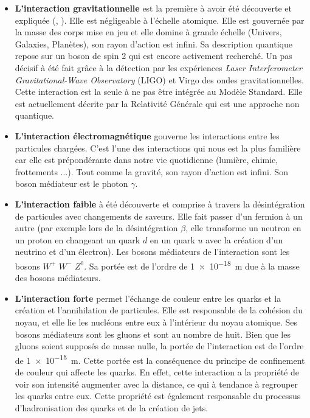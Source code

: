 \begin{itemize}[label=$\bullet$]
\item \textbf{L'interaction gravitationnelle} est la première à avoir été découverte et expliquée (, ). Elle est négligeable à l'échelle atomique. Elle est gouvernée par la masse des corps mise en jeu et elle domine à grande échelle (Univers, Galaxies, Planètes), son rayon d'action est infini. Sa description quantique repose sur un boson de spin \num{2} qui est encore activement recherché. Un pas décisif à été fait grâce à la détection par les expériences \textit{Laser Interferometer Gravitational-Wave Observatory} (LIGO) et Virgo des ondes gravitationnelles. Cette interaction est la seule à ne pas être intégrée au Modèle Standard. Elle est actuellement décrite par la Relativité Générale qui est une approche non quantique.

\item \textbf{L'interaction électromagnétique} gouverne les interactions entre les particules chargées. C'est l'une des interactions qui nous est la plus familière car elle est prépondérante dans notre vie quotidienne (lumière, chimie, frottements ...). Tout comme la gravité, son rayon d'action est infini. Son boson médiateur est le photon $\gamma$.

\item \textbf{L'interaction faible} à été découverte et comprise à travers la désintégration de particules avec changements de saveurs. Elle fait passer d'un fermion à un autre (par exemple lors de la désintégration $\beta$, elle transforme un neutron en un proton en changeant un quark $d$ en un quark $u$ avec la création d'un neutrino et d'un électron). Les bosons médiateurs de l'interaction sont les bosons $W^{+}$ $W^{-}$ $Z^{0}$. Sa portée est de l'ordre de \SI{1e-18}{\meter} due à la masse des bosons médiateurs.

\item \textbf{L'interaction forte} permet l'échange de couleur entre les quarks et la création et l'annihilation de particules. Elle est responsable de la cohésion du noyau, et elle lie les nucléons entre eux à l'intérieur du noyau atomique. Ses bosons médiateurs sont les gluons et sont au nombre de huit. Bien que les gluons soient supposés de masse nulle, la portée de l'interaction est de l'ordre de \SI{1e-15}{\meter}. Cette portée est la conséquence du principe de confinement de couleur qui affecte les quarks. En effet, cette interaction a la propriété de voir son intensité augmenter avec la distance, ce qui à tendance à regrouper les quarks entre eux. Cette propriété est également responsable du processus d'hadronisation des quarks et de la création de jets.
\end{itemize}

